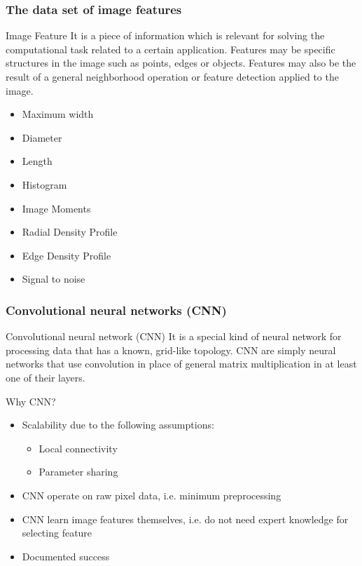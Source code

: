 \documentclass{beamer}
\begin{document}
\begin{frame}
\frametitle{The data set of image features}

\begin{block}{Image Feature}
It is a piece of information which is relevant for solving the computational task related to a certain application. Features may be specific structures in the image such as points, edges or objects. Features may also be the result of a general neighborhood operation or feature detection applied to the image.
\end{block}

\begin{itemize}
\item Maximum width
\item Diameter
\item Length
\item Histogram
\item Image Moments 
\item Radial Density Profile
\item Edge Density Profile
\item Signal to noise
\end{itemize}

\end{frame}

%
%

\begin{frame}
\frametitle{Convolutional neural networks (CNN)}
\begin{block}{Convolutional neural network (CNN)}
It is a special kind of neural network for processing data that has a known, grid-like topology. CNN are simply neural networks that use convolution in place of general matrix multiplication in at least one of their layers.
\end{block}

Why CNN?
\begin{itemize}
\item Scalability due to the following assumptions:
\begin{itemize}
\item Local connectivity
\item Parameter sharing
\end{itemize}
\item CNN operate on raw pixel data, i.e. minimum preprocessing
\item CNN learn image features themselves, i.e. do not need expert knowledge for selecting feature
\item Documented success
\end{itemize}
\end{frame}
\end{document}

